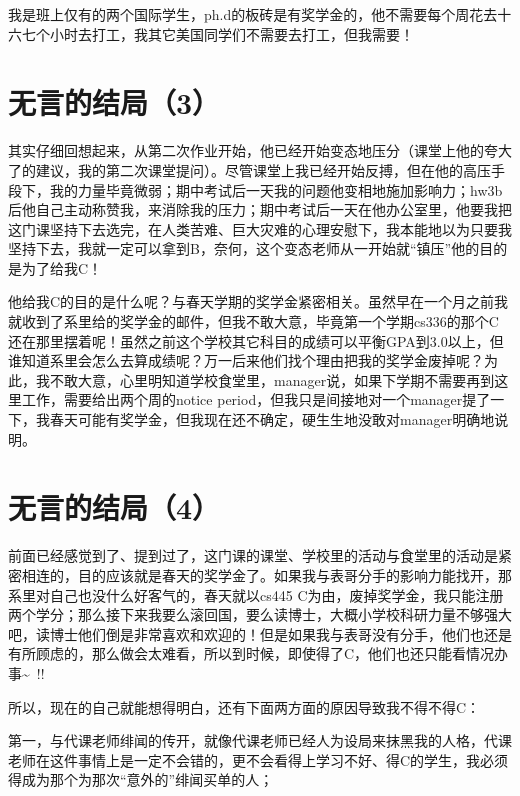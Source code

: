 \documentclass[12pt]{book}
\begin{document}
我是班上仅有的两个国际学生，ph.d的板砖是有奖学金的，他不需要每个周花去十六七个小时去打工，我其它美国同学们不需要去打工，但我需要！

\section{无言的结局（3）}
\label{sec-10-3}

其实仔细回想起来，从第二次作业开始，他已经开始变态地压分（课堂上他的夸大了的建议，我的第二次课堂提问）。尽管课堂上我已经开始反搏，但在他的高压手段下，我的力量毕竟微弱；期中考试后一天我的问题他变相地施加影响力；hw3b后他自己主动称赞我，来消除我的压力；期中考试后一天在他办公室里，他要我把这门课坚持下去选完，在人类苦难、巨大灾难的心理安慰下，我本能地以为只要我坚持下去，我就一定可以拿到B，奈何，这个变态老师从一开始就“镇压”他的目的是为了给我C！

他给我C的目的是什么呢？与春天学期的奖学金紧密相关。虽然早在一个月之前我就收到了系里给的奖学金的邮件，但我不敢大意，毕竟第一个学期cs336的那个C还在那里摆着呢！虽然之前这个学校其它科目的成绩可以平衡GPA到3.0以上，但谁知道系里会怎么去算成绩呢？万一后来他们找个理由把我的奖学金废掉呢？为此，我不敢大意，心里明知道学校食堂里，manager说，如果下学期不需要再到这里工作，需要给出两个周的notice period，但我只是间接地对一个manager提了一下，我春天可能有奖学金，但我现在还不确定，硬生生地没敢对manager明确地说明。

\section{无言的结局（4）}
\label{sec-10-4}

前面已经感觉到了、提到过了，这门课的课堂、学校里的活动与食堂里的活动是紧密相连的，目的应该就是春天的奖学金了。如果我与表哥分手的影响力能找开，那系里对自己也没什么好客气的，春天就以cs445 C为由，废掉奖学金，我只能注册两个学分；那么接下来我要么滚回国，要么读博士，大概小学校科研力量不够强大吧，读博士他们倒是非常喜欢和欢迎的！但是如果我与表哥没有分手，他们也还是有所顾虑的，那么做会太难看，所以到时候，即使得了C，他们也还只能看情况办事\textasciitilde{}~!!

所以，现在的自己就能想得明白，还有下面两方面的原因导致我不得不得C：

第一，与代课老师绯闻的传开，就像代课老师已经人为设局来抹黑我的人格，代课老师在这件事情上是一定不会错的，更不会看得上学习不好、得C的学生，我必须得成为那个为那次“意外的”绯闻买单的人；
\end{document}
